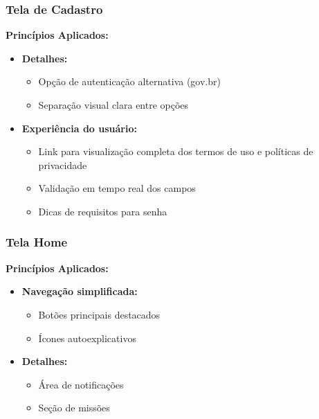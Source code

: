 \documentclass[a4paper, 12pt]{article}
\begin{document}
\subsubsection{Tela de Cadastro}
\textbf{Princípios Aplicados:}
\begin{itemize}[leftmargin=*]  
    \item \textbf{Detalhes:}
    \begin{itemize}
        \item Opção de autenticação alternativa (gov.br)
        \item Separação visual clara entre opções
    \end{itemize}

    \item \textbf{Experiência do usuário:}
    \begin{itemize}
        \item Link para visualização completa dos termos de uso e políticas de privacidade
        \item Validação em tempo real dos campos
        \item Dicas de requisitos para senha
    \end{itemize}
\end{itemize}

\subsubsection{Tela Home}
\textbf{Princípios Aplicados:}
\begin{itemize}[leftmargin=*]
    \item \textbf{Navegação simplificada:}
    \begin{itemize}
        \item Botões principais destacados
        \item Ícones autoexplicativos
    \end{itemize}

    \item \textbf{Detalhes:}
    \begin{itemize}
        \item Área de notificações
        \item Seção de missões
    \end{itemize}
\end{itemize}
\end{document}
